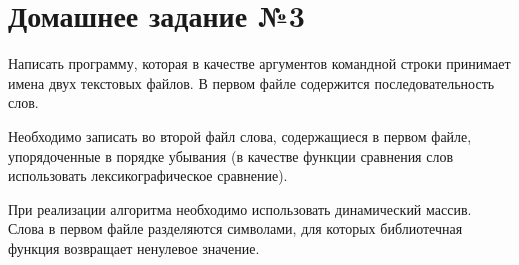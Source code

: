\section*{Домашнее задание №3}


Написать программу, которая в качестве аргументов командной строки
принимает имена двух текстовых файлов. В первом файле содержится
последовательность слов.

Необходимо записать во второй файл слова,
содержащиеся в первом файле, упорядоченные в порядке убывания (в
качестве функции сравнения слов использовать лексикографическое
сравнение).

При реализации алгоритма необходимо использовать
динамический массив. Слова в первом файле разделяются символами, для
которых библиотечная функция  возвращает ненулевое значение.
